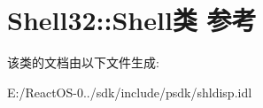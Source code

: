 \hypertarget{class_shell32_1_1_shell}{}\section{Shell32\+:\+:Shell类 参考}
\label{class_shell32_1_1_shell}


该类的文档由以下文件生成\+:\begin{DoxyCompactItemize}
\item 
E\+:/\+React\+O\+S-\/0../sdk/include/psdk/shldisp.\+idl\end{DoxyCompactItemize}
